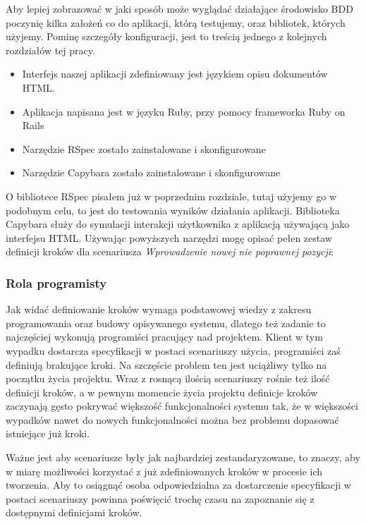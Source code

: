       Aby lepiej zobrazować w jaki sposób może wyglądać działające środowisko BDD poczynię kilka założeń co do aplikacji, którą testujemy, oraz bibliotek, których użyjemy. Pominę szczegóły konfiguracji, jest to treścią jednego z kolejnych rozdziałów tej pracy.
      
      \begin{itemize}
        \item Interfejs naszej aplikacji zdefiniowany jest językiem opisu dokumentów HTML.
        \item Aplikacja napisana jest w języku Ruby, przy pomocy frameworka Ruby on Rails
        \item Narzędzie RSpec zostało zainstalowane i skonfigurowane
        \item Narzędzie Capybara zostało zainstalowane i skonfigurowane
      \end{itemize}
      
      O bibliotece RSpec pisałem już w poprzednim rozdziale, tutaj użyjemy go w podobnym celu, to jest do testowania wyników działania aplikacji. Biblioteka Capybara służy do symulacji interakcji użytkownika z aplikacją używającą jako interfejsu HTML. Używając powyższych narzędzi mogę opisać pełen zestaw definicji kroków dla scenariusza \emph{Wprowadzenie nowej nie poprawnej pozycji}:
      
      
      
    \subsubsection{Rola programisty}
    
      Jak widać definiowanie kroków wymaga podstawowej wiedzy z zakresu programowania oraz budowy opisywanego systemu, dlatego też zadanie to najczęściej wykonują programiści pracujący nad projektem.  Klient w tym wypadku dostarcza specyfikacji w postaci scenariuszy użycia, programiści zaś definiują brakujące kroki. Na szczęście problem ten jest uciążliwy tylko na początku życia projektu. Wraz z rosnącą ilością scenariuszy rośnie też ilość definicji kroków, a w pewnym momencie życia projektu definicje kroków zaczynają gęsto pokrywać większość funkcjonalności systemu tak, że w większości wypadków nawet do nowych funkcjonalności można bez problemu dopasować istniejące już kroki.
      
      Ważne jest aby scenariusze były jak najbardziej zestandaryzowane, to znaczy, aby w miarę możliwości korzystać z już zdefiniowanych kroków w procesie ich tworzenia. Aby to osiągnąć osoba odpowiedzialna  za dostarczenie specyfikacji w postaci scenariuszy powinna poświęcić trochę czasu na zapoznanie się z dostępnymi definicjami kroków.
      
